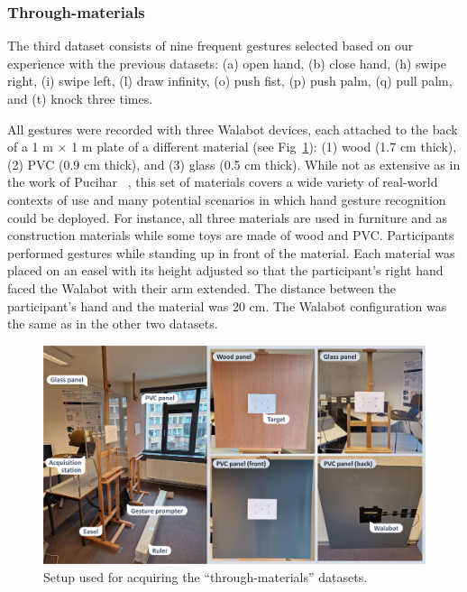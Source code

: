 \subsubsection{Through-materials} \label{sec:radar-experiments:data-collection:datasets:through-materials}
The third dataset consists of nine frequent gestures selected based on our experience with the previous datasets: (a) open hand, (b) close hand, (h) swipe right, (i) swipe left, (l) draw infinity, (o) push fist, (p) push palm, (q) pull palm, and (t) knock three times. 

All gestures were recorded with three Walabot devices, each attached to the back of a 1 m $\times$ 1 m plate of a different material (see Fig~\ref{fig:radar-experiments:setup-walabot-materials}): (1) wood (1.7 cm thick), (2) PVC (0.9 cm thick), and (3) glass (0.5 cm thick).
While not as extensive as in the work of Pucihar \etal~\cite{Pucihar:2022}, this set of materials covers a wide variety of real-world contexts of use and many potential scenarios in which hand gesture recognition could be deployed. For instance, all three materials are used in furniture and as construction materials while some toys are made of wood and PVC. 
Participants performed gestures while standing up in front of the material.
Each material was placed on an easel with its height adjusted so that the participant's right hand faced the Walabot with their arm extended. The distance between the participant's hand and the material was 20 cm. The Walabot configuration was the same as in the other two datasets.

\begin{figure}[t]
    \centering
    \includegraphics[width=\linewidth]{Figures/RadarExperiments/Datasets/ThroughMaterials/setup-walabot-materials.pdf}
    \vspace{-12pt}
    \caption{Setup used for acquiring the ``through-materials'' datasets.}
    \label{fig:radar-experiments:setup-walabot-materials}
    \vspace{-8pt}
\end{figure}


